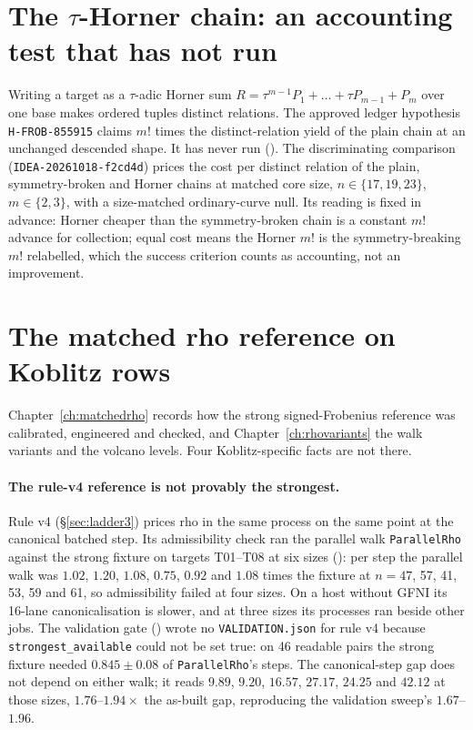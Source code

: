 \section{The $\tau$-Horner chain: an accounting test that has not run}\label{sec:kc-horner}

Writing a target as a $\tau$-adic Horner sum
$R=\tau^{m-1}P_1+\dots+\tau P_{m-1}+P_m$ over one base makes ordered tuples
distinct relations. The approved ledger hypothesis \texttt{H-FROB-855915}
claims $m!$ times the distinct-relation yield of the plain chain at an
unchanged descended shape. It has never run
().
The discriminating comparison (\texttt{IDEA-20261018-f2cd4d}) prices the
cost per distinct relation of the plain, symmetry-broken and Horner chains
at matched core size, $n\in\{17,19,23\}$, $m\in\{2,3\}$, with a size-matched
ordinary-curve null. Its reading is fixed in advance: Horner cheaper than
the symmetry-broken chain is a constant $m!$ advance for collection; equal
cost means the Horner $m!$ is the symmetry-breaking $m!$ relabelled, which
the success criterion counts as accounting, not an improvement.

\section{The matched rho reference on Koblitz rows}\label{sec:kc-rho}

Chapter~\ref{ch:matchedrho} records how the strong signed-Frobenius
reference was calibrated, engineered and checked, and
Chapter~\ref{ch:rhovariants} the walk variants and the volcano levels. Four
Koblitz-specific facts are not there.

\paragraph{The rule-v4 reference is not provably the strongest.} Rule v4
(\S\ref{sec:ladder3}) prices rho in the same process on the same point at
the canonical batched step. Its admissibility check ran the parallel walk
\texttt{ParallelRho} against the strong fixture on targets T01--T08 at six
sizes (): per step the
parallel walk was $1.02$, $1.20$, $1.08$, $0.75$, $0.92$ and $1.08$ times the
fixture at $n=47$, 57, 41, 53, 59 and 61, so admissibility failed at four
sizes. On a host without GFNI its 16-lane canonicalisation is slower, and at
three sizes its processes ran beside other jobs. The validation gate
() wrote no
\texttt{VALIDATION.json} for rule v4 because \texttt{strongest\_available}
could not be set true: on 46 readable pairs the strong fixture needed
$0.845\pm0.08$ of \texttt{ParallelRho}'s steps. The canonical-step gap does
not depend on either walk; it reads $9.89$, $9.20$, $16.57$, $27.17$,
$24.25$ and $42.12$ at those sizes, $1.76$--$1.94\times$ the as-built gap,
reproducing the validation sweep's $1.67$--$1.96$.

